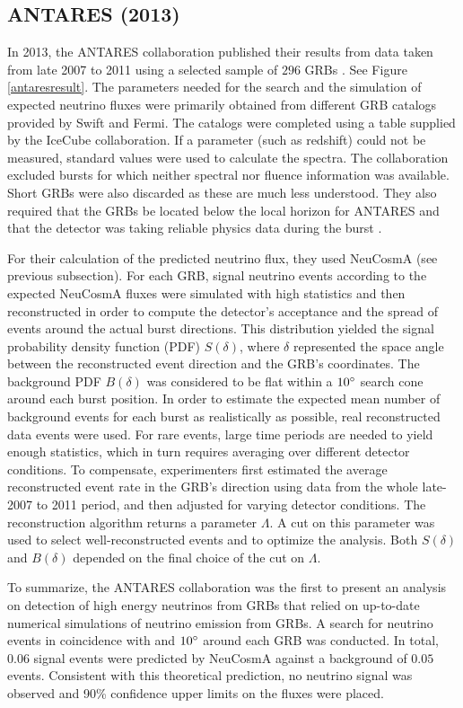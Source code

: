 \documentclass[12pt]{article}
\begin{document}
\begin{doublespace}
\subsection{ANTARES (2013)}

In 2013, the ANTARES collaboration published their results from data taken from late 2007 to 2011 using a selected sample of $296$ GRBs \cite{antares}. See Figure \ref{antaresresult}. The parameters needed for the search and the simulation of expected neutrino fluxes were primarily obtained from different GRB catalogs provided by Swift and Fermi. The catalogs were completed using a table supplied by the IceCube collaboration. If a parameter (such as redshift) could not be measured, standard values were used to calculate the spectra. The collaboration excluded bursts for which neither spectral nor fluence information was available. Short GRBs were also discarded as these are much less understood. They also required that the GRBs be located below the local horizon for ANTARES and that the detector was taking reliable physics data during the burst \cite{antares}. \par
For their calculation of the predicted neutrino flux, they used NeuCosmA (see previous subsection). For each GRB, signal neutrino events according to the expected NeuCosmA fluxes were simulated with high statistics and then reconstructed in order to compute the detector's acceptance and the spread of events around the actual burst directions. This distribution yielded the signal probability density function (PDF) $S(\delta)$, where $\delta$ represented the space angle between the reconstructed event direction and the GRB's coordinates. The background PDF $B(\delta)$ was considered to be flat within a $10\degree$ search cone around each burst position. In order to estimate the expected mean number of background events for each burst as realistically as possible, real reconstructed data events were used. For rare events, large time periods are needed to yield enough statistics, which in turn requires averaging over different detector conditions. To compensate, experimenters first estimated the average reconstructed event rate in the GRB's direction using data from the whole late-2007 to 2011 period, and then adjusted for varying detector conditions. The reconstruction algorithm returns a parameter $\Lambda$. A cut on this parameter was used to select well-reconstructed events and to optimize the analysis. Both $S(\delta)$ and $B(\delta)$ depended on the final choice of the cut on $\Lambda$. \par
To summarize, the ANTARES collaboration was the first to present an analysis on detection of high energy neutrinos from GRBs that relied on up-to-date numerical simulations of neutrino emission from GRBs. A search for neutrino events in coincidence with and $10\degree$ around each GRB was conducted. In total, $0.06$ signal events were predicted by NeuCosmA against a background of $0.05$ events. Consistent with this theoretical prediction, no neutrino signal was observed and 90\% confidence upper limits on the fluxes were placed. 
 

\end{doublespace}
\end{document}
